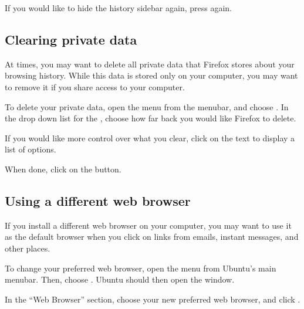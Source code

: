 If you would like to hide the history sidebar again, press 
again.

\subsection{Clearing private data}

At times, you may want to delete all private data that Firefox stores about
your browsing history. While this data is stored only on your computer,
you may want to remove it if you share access to your computer.

To delete your private data, open the  menu from the menubar, and
choose . In the drop down list for the
, choose how far back you would like Firefox
to delete. 

If you would like more control over what you clear, click on the 
 text to display a list of options. 

When done, click on the  button.


\subsection{Using a different web browser}


If you install a different web browser on your computer, you may want to use it as the 
default browser when you click on links from emails, instant messages, and other places. 

To change your preferred web browser, open the  menu from Ubuntu's
main menubar. Then, choose   . Ubuntu should then open the  
window.

In the ``Web Browser'' section, choose your new preferred web browser, and 
click .
